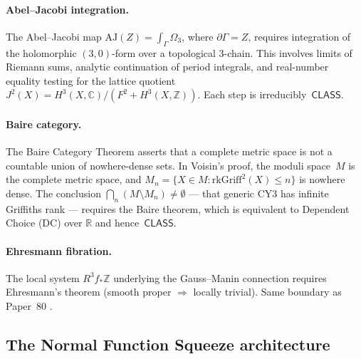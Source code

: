 \documentclass[11pt]{article}
\theoremstyle{plain}
\theoremstyle{definition}
\theoremstyle{remark}
\newcommand{\Z}{\mathbb{Z}}
\newcommand{\R}{\mathbb{R}}
\newcommand{\C}{\mathbb{C}}
\newcommand{\rk}{\mathrm{rk}}
\newcommand{\Griff}{\mathrm{Griff}}
\newcommand{\AJ}{\mathrm{AJ}}
\newcommand{\CLASS}{\ensuremath{\mathsf{CLASS}}}
\begin{document}
\paragraph{Abel--Jacobi integration.}
The Abel--Jacobi map $\AJ(Z) = \int_\Gamma \Omega_3$, where $\partial\Gamma = Z$, requires integration of the holomorphic $(3,0)$-form over a topological $3$-chain. This involves limits of Riemann sums, analytic continuation of period integrals, and real-number equality testing for the lattice quotient $J^2(X) = H^3(X,\C)/(F^2 + H^3(X,\Z))$. Each step is irreducibly~$\CLASS$.

\paragraph{Baire category.}
The Baire Category Theorem asserts that a complete metric space is not a countable union of nowhere-dense sets. In Voisin's proof, the moduli space~$M$ is the complete metric space, and $M_n = \{X \in M : \rk \Griff^2(X) \leq n\}$ is nowhere dense. The conclusion $\bigcap_n (M \setminus M_n) \neq \emptyset$ --- that generic CY3 has infinite Griffiths rank --- requires the Baire theorem, which is equivalent to Dependent Choice (DC) over $\R$ and hence~$\CLASS$.

\paragraph{Ehresmann fibration.}
The local system $R^3 f_* \Z$ underlying the Gauss--Manin connection requires Ehresmann's theorem (smooth proper $\Rightarrow$ locally trivial). Same boundary as Paper~80 \cite{paper80}.

\subsection{The Normal Function Squeeze architecture}
\end{document}
